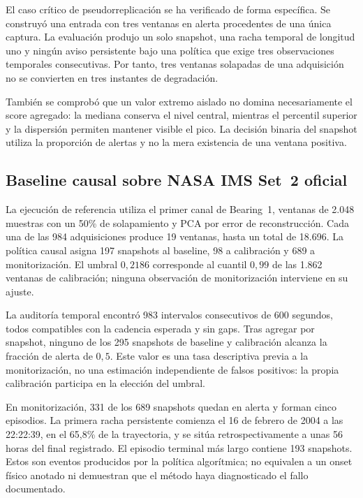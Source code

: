 El caso crítico de pseudorreplicación se ha verificado de forma específica. Se
construyó una entrada con tres ventanas en alerta procedentes de una única
captura. La evaluación produjo un solo snapshot, una racha temporal de longitud
uno y ningún aviso persistente bajo una política que exige tres observaciones
temporales consecutivas. Por tanto, tres ventanas solapadas de una adquisición
no se convierten en tres instantes de degradación.

También se comprobó que un valor extremo aislado no domina necesariamente el
score agregado: la mediana conserva el nivel central, mientras el percentil
superior y la dispersión permiten mantener visible el pico. La decisión binaria
del snapshot utiliza la proporción de alertas y no la mera existencia de una
ventana positiva.

\subsection{Baseline causal sobre NASA IMS Set~2 oficial}

La ejecución de referencia utiliza el primer canal de Bearing~1, ventanas de
2.048 muestras con un 50\% de solapamiento y PCA por error de reconstrucción.
Cada una de las 984 adquisiciones produce 19 ventanas, hasta un total de 18.696.
La política causal asigna 197 snapshots al baseline, 98 a calibración y 689 a
monitorización. El umbral $0{,}2186$ corresponde al cuantil $0{,}99$ de las
1.862 ventanas de calibración; ninguna observación de monitorización interviene
en su ajuste.

La auditoría temporal encontró 983 intervalos consecutivos de 600 segundos,
todos compatibles con la cadencia esperada y sin gaps. Tras agregar por
snapshot, ninguno de los 295 snapshots de baseline y calibración alcanza la
fracción de alerta de $0{,}5$. Este valor es una tasa descriptiva previa a la
monitorización, no una estimación independiente de falsos positivos: la propia
calibración participa en la elección del umbral.

En monitorización, 331 de los 689 snapshots quedan en alerta y forman cinco
episodios. La primera racha persistente comienza el 16 de febrero de 2004 a las
22:22:39, en el 65,8\% de la trayectoria, y se sitúa retrospectivamente a unas
56 horas del final registrado. El episodio terminal más largo contiene 193
snapshots. Estos son eventos producidos por la política algorítmica; no equivalen
a un onset físico anotado ni demuestran que el método haya diagnosticado el
fallo documentado.

